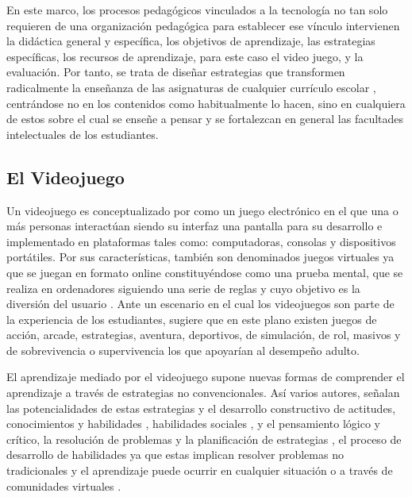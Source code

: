 \documentclass{textolivre}
\begin{document}
En este marco, los procesos pedagógicos vinculados a la tecnología no tan solo requieren de una organización pedagógica para establecer ese vínculo intervienen la didáctica general y específica, los objetivos de aprendizaje, las estrategias específicas, los recursos de aprendizaje, para este caso el video juego, y la evaluación. Por tanto, se trata de diseñar estrategias que transformen radicalmente la enseñanza de las asignaturas de cualquier currículo escolar \cite{maclure2003}, 
centrándose no en los contenidos como habitualmente lo hacen, sino en cualquiera de estos sobre el cual se enseñe a pensar y se fortalezcan en general las facultades intelectuales de los estudiantes.

\subsection{El Videojuego}\label{elvideo}

Un videojuego es conceptualizado por \textcite{riveraarteaga2018} %
como un juego electrónico en el que una o más personas interactúan siendo su interfaz una pantalla para su desarrollo e implementado en plataformas tales como: computadoras, consolas y dispositivos portátiles. Por sus características, también son denominados juegos virtuales ya que se juegan en formato online \cite{lacasa2011} %
constituyéndose como una prueba mental, que se realiza en ordenadores siguiendo una serie de reglas y cuyo objetivo es la diversión del usuario \cite{zyda2005}. %
Ante un escenario en el cual los videojuegos son parte de la experiencia de los estudiantes, \textcite{sedeno2010} %
sugiere que en este plano existen juegos de acción, arcade, estrategias, aventura, deportivos, de simulación, de rol, masivos y de sobrevivencia o supervivencia los que apoyarían al desempeño adulto.

El aprendizaje mediado por el videojuego supone nuevas formas de comprender el aprendizaje a través de estrategias no convencionales. Así varios autores, señalan las potencialidades de estas estrategias y el desarrollo constructivo de actitudes, conocimientos y habilidades \cite{eguia2013}, %
habilidades sociales \cite{dondi2014}, %
y el pensamiento lógico y crítico, la resolución de problemas y la planificación de estrategias \cite{kirriemuir2004, riveraarteaga2018}, %
el proceso de desarrollo de habilidades ya que estas implican resolver problemas no tradicionales y el aprendizaje puede ocurrir en cualquier situación o a través de comunidades virtuales \cite{lacasa2011}. %
\end{document}
